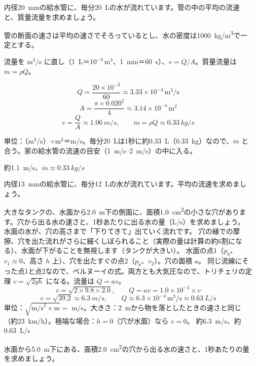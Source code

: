 \begin{reidai}[家の給水管の流速]
\label{ph:力-13:ex3}内径\qty{20}{mm}の給水管に、毎分\qty{20}{L}の水が流れています。管の中の平均の流速と、質量流量を求めましょう。
\par{} 管の断面の速さは平均の速さでそろっているとし、水の密度は\qty{1000}{kg/m^3}で一定とする。
\par\kangaekata 流量を m$^3$/s に直し（\qty{1}{L}＝$10^{-3}$\,m$^3$、\qty{1}{min}＝\qty{60}{s}）、$v=Q/A$。質量流量は $\dot m=\rho Q$。
\par\shiki
\[ Q=\frac{20\times10^{-3}}{60}\approx3.33\times10^{-4}\,\mathrm{m^3/s} \]
\[ A=\frac{\pi\times0.020^2}{4}\approx3.14\times10^{-4}\,\mathrm{m^2} \]
\[ v=\frac{Q}{A}\approx\qty{1.06}{m/s},\qquad \dot m=\rho Q\approx\qty{0.33}{kg/s} \]
\par{} 単位：（m$^3$/s）÷m$^2$＝m/s。毎分\qty{20}{L}は1秒に約\qty{0.33}{L}（\qty{0.33}{kg}）なので、$\dot m$ と合う。家の給水管の流速の目安（\qtyrange{1}{2}{m/s}）の中に入る。
\par\kotae 約\qty{1.1}{m/s}、$\dot m\approx\qty{0.33}{kg/s}$
\end{reidai}
\begin{jibun}
内径\qty{13}{mm}の給水管に、毎分\qty{12}{L}の水が流れています。平均の流速を求めましょう。
\end{jibun}

\begin{phreidai}[タンクの穴から出る水]
\label{ph:力-13:ex4}大きなタンクの、水面から\qty{2.0}{m}下の側面に、面積\qty{1.0}{cm^2}の小さな穴があります。穴から出る水の速さと、1秒あたりに出る水の量（L/s）を求めましょう。
\phbamen
水面の水が、穴の高さまで「下りてきて」出ていく流れです。
\phmushi
穴の縁での摩擦、穴を出た流れがさらに細くしぼられること（実際の量は計算の約6割になる）、水面が下がることを無視します（タンクが大きい）。
\phzu
水面の点1（$p_0$、$v_1\approx0$、高さ $h$ 上）、穴を出たすぐの点2（$p_0$、$v_2$）。穴の面積 $a$。
\phriyu
同じ流線にそった点1と点2なので、ベルヌーイの式。両方とも大気圧なので、トリチェリの定理 $v=\sqrt{2gh}$ になる。流量は $Q=av$。
\phtateru
\[ v=\sqrt{2\times9.8\times2.0},\qquad Q=a v=1.0\times10^{-4}\times v \]
\phtoku
\[ v=\sqrt{39.2}\approx\qty{6.3}{m/s},\qquad Q\approx6.3\times10^{-4}\,\mathrm{m^3/s}\approx\qty{0.63}{L/s} \]
\phtashikame
単位：$\sqrt{\text{m/s}^2\times\text{m}}=$ m/s。大きさ：\qty{2}{m}から物を落としたときの速さと同じ（約\qty{23}{km/h}）。極端な場合：$h=0$（穴が水面）なら $v=0$。
\kotae 約\qty{6.3}{m/s}、約\qty{0.63}{L/s}
\end{phreidai}
\begin{jibun}
水面から\qty{5.0}{m}下にある、面積\qty{2.0}{cm^2}の穴から出る水の速さと、1秒あたりの量を求めましょう。
\end{jibun}

